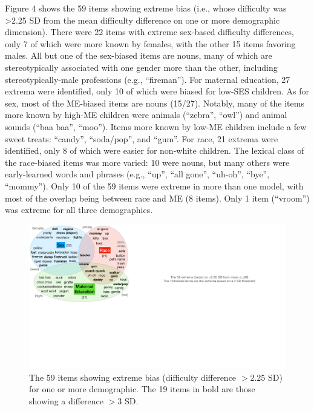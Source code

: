 \documentclass[10pt, letterpaper]{article}
\newenvironment{CodeChunk}{}{}
\begin{document}
Figure 4 shows the 59 items showing extreme bias (i.e., whose difficulty
was \textgreater2.25 SD from the mean difficulty difference on one or
more demographic dimension). There were 22 items with extreme sex-based
difficulty differences, only 7 of which were more known by females, with
the other 15 items favoring males. All but one of the sex-biased items
are nouns, many of which are stereotypically associated with one gender
more than the other, including stereotypically-male professions (e.g.,
``fireman''). For maternal education, 27 extrema were identified, only
10 of which were biased for low-SES children. As for sex, most of the
ME-biased items are nouns (15/27). Notably, many of the items more known
by high-ME children were animals (``zebra'', ``owl'') and animal sounds
(``baa baa'', ``moo''). Items more known by low-ME children include a
few sweet treats: ``candy'', ``soda/pop'', and ``gum''. For race, 21
extrema were identified, only 8 of which were easier for non-white
children. The lexical class of the race-biased items was more varied: 10
were nouns, but many others were early-learned words and phrases (e.g.,
``up'', ``all gone'', ``uh-oh'', ``bye'', ``mommy''). Only 10 of the 59
items were extreme in more than one model, with most of the overlap
being between race and ME (8 items). Only 1 item (``vroom'') was extreme
for all three demographics.

\begin{CodeChunk}
\begin{figure}[h]

{\centering \includegraphics[width=\linewidth]{figs/extrema2p25sd_3sd_bold} 

}

\caption[The 59 items showing extreme bias (difficulty difference $>2.25$ SD) for one or more demographic]{The 59 items showing extreme bias (difficulty difference $>2.25$ SD) for one or more demographic. The 19 items in bold are those showing a difference $>3$ SD.}\label{fig:biased-words}
\end{figure}
\end{CodeChunk}
\end{document}
